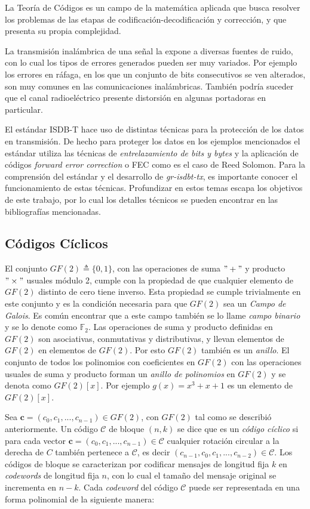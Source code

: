 La Teoría de Códigos es un campo de la matemática aplicada que busca resolver los problemas de las etapas de codificación-decodificación y corrección, y que presenta su propia complejidad.

La transmisión inalámbrica de una señal la expone a diversas fuentes de ruido, con lo cual los tipos de errores generados pueden ser muy variados. Por ejemplo los errores en ráfaga, en los que un conjunto de bits consecutivos se ven alterados, son muy comunes en las comunicaciones inalámbricas. También podría suceder que el canal radioeléctrico presente distorsión en algunas portadoras en particular.

El estándar ISDB-T hace uso de distintas técnicas para la protección de los datos en transmisión. De hecho para proteger los datos en los ejemplos mencionados el estándar utiliza las técnicas de \textit{entrelazamiento de bits y bytes} y la aplicación de códigos \textit{forward error correction} o FEC como es el caso de Reed Solomon. Para la comprensión del estándar y el desarrollo de \textit{gr-isdbt-tx}, es importante conocer el funcionamiento de estas técnicas. Profundizar en estos temas escapa los objetivos de este trabajo, por lo cual los detalles técnicos se pueden encontrar en las bibliografías mencionadas.


\subsection{Códigos Cíclicos}
El conjunto $GF(2) \triangleq \{0,1\}$, con las operaciones de suma $" + "$ y producto $" \times "$ usuales módulo 2, cumple con la propiedad de que cualquier elemento de $GF(2)$ distinto de cero tiene inverso. Esta propiedad se cumple trivialmente en este conjunto y es la condición necesaria para que $GF(2)$ sea un \textit{Campo de Galois}. Es común encontrar que a este campo también se lo llame \textit{campo binario} y se lo denote como $\mathbb {F}_2$.
Las operaciones de suma y producto definidas en $GF(2)$ son asociativas, conmutativas y distributivas, y llevan elementos de $GF(2)$ en elementos de $GF(2)$. Por esto $GF(2)$ también es un \textit{anillo}. 
El conjunto de todos los polinomios con coeficientes en $GF(2)$ con las operaciones usuales de suma y producto forman un \textit{anillo de polinomios} en $GF(2)$ y se denota como $GF(2)[x]$. Por ejemplo $g(x) = x^3 + x + 1$ es un elemento de $GF(2)[x]$.

Sea $\textbf{c} = (c_0, c_1, ..., c_{n-1}) \in GF(2)$, con $GF(2)$ tal como se describió anteriormente. Un código $\mathcal{C}$ de bloque $(n, k)$ se dice que es un \textit{código cíclico} si para cada vector $\textbf{c} = (c_0, c_1, ..., c_{n-1}) \in \mathcal{C}$ cualquier rotación circular a la derecha de $C$ también pertenece a $\mathcal{C}$, es decir $(c_{n-1}, c_0, c_1, ..., c_{n-2}) \in \mathcal{C}$.
Los códigos de bloque se caracterizan por codificar mensajes de longitud fija $k$ en \textit{codewords} de longitud fija $n$, con lo cual el tamaño del mensaje original se incrementa en $n-k$.
Cada \textit{codeword} del código $\mathcal{C}$ puede ser representada en una forma polinomial de la siguiente manera:

